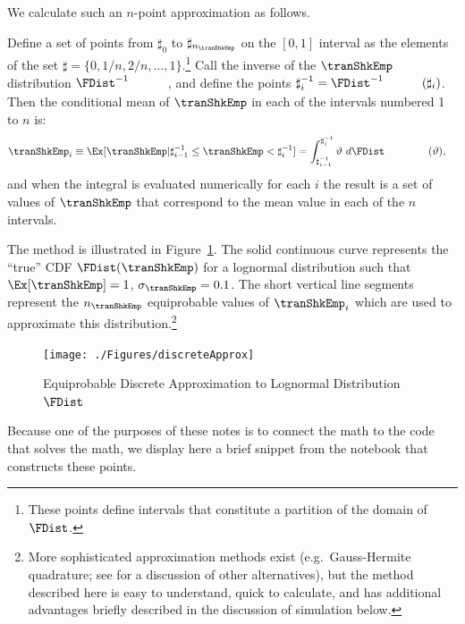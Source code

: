 \documentclass[titlepage, headings=optiontotocandhead]{econtex}
\begin{document}
We calculate such an $n$-point approximation as follows.

Define a set of points from $\sharp_{0}$ to $\sharp_{n_{\tranShkEmp}}$ on the $[0,1]$ interval
as the elements of the set $\sharp = \{0,1/n,2/n, \ldots,1\}$.\footnote{These points define intervals that constitute a partition of the domain of $\FDist$.}  Call the inverse of the $\tranShkEmp$ distribution $\FDist^{-1}_{\phantom{\tranShkEmp}}$, and define the
points $\sharp^{-1}_{i} = \FDist^{-1}_{\phantom{\tranShkEmp}}(\sharp_{i})$.  Then
the conditional mean of $\tranShkEmp$ in each of the intervals numbered 1 to $n$ is:
\begin{equation}\begin{gathered}\begin{aligned}
      \tranShkEmp_{i} \equiv \Ex[\tranShkEmp | \sharp_{i-1}^{-1} \leq \tranShkEmp < \sharp_{i}^{-1}]  & = \int_{\sharp^{-1}_{i-1}}^{\sharp^{-1}_{i}} \vartheta ~ d\FDist_{\phantom{\tranShkEmp}}(\vartheta)  ,
    \end{aligned}\end{gathered}\end{equation}
and when the integral is evaluated numerically for each $i$ the result is a set of values of $\tranShkEmp$ that correspond to the mean value in each of the $n$ intervals.

The method is illustrated in Figure~\ref{fig:discreteapprox}.  The solid continuous curve represents
the ``true'' CDF $\FDist(\tranShkEmp)$ for a lognormal distribution such that $\Ex[\tranShkEmp] = 1$, $\sigma_{\tranShkEmp} = 0.1$.  The short vertical line segments represent the $n_{\tranShkEmp}$
equiprobable values of $\tranShkEmp_{i}$ which are used to approximate this
distribution.\footnote{More sophisticated approximation methods exist
  (e.g.\ Gauss-Hermite quadrature; see \cite{kopecky2010finite} for a discussion of other alternatives), but the method described here is easy to understand, quick to calculate, and has additional advantages briefly described in the discussion of simulation below.}
  \hypertarget{discreteApprox}{}
  \begin{figure}
    \texttt{[image: ./Figures/discreteApprox]}
    \caption{Equiprobable Discrete Approximation to Lognormal Distribution $\FDist$}
    \label{fig:discreteapprox}
  \end{figure}



Because one of the purposes of these notes is to connect the math to the code that solves the math, we display here a brief snippet from the notebook that constructs these points.
\end{document}
